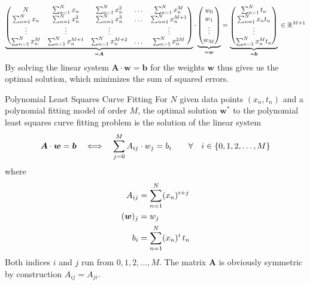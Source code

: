 \documentclass[11pt,DINA4, fleqn]{amsart}
\def\vw{\boldsymbol{w}\xspace}
\def\vb{\boldsymbol{b}\xspace}
\def\mA{\boldsymbol{A}\xspace}
\begin{document}
\begin{align}
\underbrace{
\begin{pmatrix}
N & \sum\displaylimits_{n = 1}^{N}x_n & \sum\displaylimits_{n = 1}^{N}x_n^2 & \dots & \sum\displaylimits_{n = 1}^{N}x_n^M \\
\sum\displaylimits_{n = 1}^{N}x_n & \sum\displaylimits_{n = 1}^{N}x_n^2 &
\sum\displaylimits_{n = 1}^{N}x_n^3 & \dots &
\sum\displaylimits_{n = 1}^{N}x_n^{M + 1} \\
\vdots & \vdots & \vdots && \vdots \\ 
\sum\displaylimits_{n = 1}^{N}x_n^M &
\sum\displaylimits_{n = 1}^{N}x_n^{M+1} &
\sum\displaylimits_{n = 1}^{N}x_n^{M+2} &
\dotsc &  \sum\displaylimits_{n = 1}^{N}x_n^{2M}
\end{pmatrix}}_{=\mA} \cdot
\underbrace{\begin{pmatrix}
w_0 \\ w_1 \\ \vdots \\ w_M
\end{pmatrix}}_{=\vw}
=
\underbrace{\begin{pmatrix}
\sum\displaylimits_{n = 1}^{N} t_n \\
\sum\displaylimits_{n = 1}^{N} x_n t_n \\
\vdots \\
\sum\displaylimits_{n = 1}^{N} x_n^M t_n 
\end{pmatrix}}_{=\vb} \, \in \mathbb{R}^{M+1}
\label{eq:explicitMatrixForm1}
\end{align}
By solving the linear system $\mA \cdot \vw = \vb$ for the weights $\vw$ thus gives us the optimal solution, which minimizes the sum of squared errors.

\begin{mybox_tc3}{Polynomial Least Squares Curve Fitting}
	For $N$ given data points $(x_n, t_n)$ and a polynomial fitting model of order $M$,
	the optimal solution $\vw^*$ to the polynomial least squares curve fitting problem is the solution of the linear system
	\begin{align}
	\mA \cdot \vw = \vb \quad \Longleftrightarrow \quad \sum \displaylimits_{j = 0}^{M} A_{ij} \cdot w_j = b_i  \qquad \forall\quad i \in \{0, 1, 2, \dotsc, M\}
	\end{align}
	where
	\begin{align}
	A_{ij} &= \sum \displaylimits_{n = 1}^{N} (x_n)^{i + j} \\
	(\vw)_j &= w_j \\
	b_i &= \sum \displaylimits_{n = 1}^{N} (x_n)^{i} \, t_n
	\end{align}
	Both indices $i$ and $j$ run from $0, 1, 2, \dotsc, M$.
	The matrix $\mA$ is obviously symmetric by construction $A_{ij} = A_{ji}$.
\end{mybox_tc3}
\end{document}
